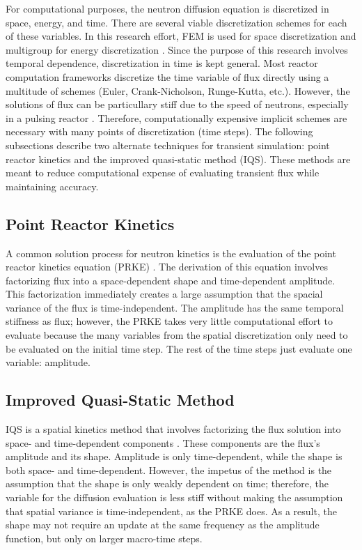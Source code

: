 For computational purposes, the neutron diffusion equation is discretized in space, energy, and time.  There are several viable discretization schemes for each of these variables. In this research effort, FEM is used for space discretization and multigroup for energy discretization \cite{zeinkiewicz2005finite, duderstadt1976nuclear}. Since the purpose of this research involves temporal dependence, discretization in time is kept general. Most reactor computation frameworks discretize the time variable of flux directly using a multitude of schemes (Euler, Crank-Nicholson, Runge-Kutta, etc.).  However, the solutions of flux can be particullary stiff due to the speed of neutrons, especially in a pulsing reactor \cite{TWIGL_benchmark}. Therefore, computationally expensive implicit schemes are necessary with many points of discretization (time steps). The following subsections describe two alternate techniques for transient simulation: point reactor kinetics and the improved quasi-static method (IQS). These methods are meant to reduce computational expense of evaluating transient flux while maintaining accuracy.

\subsection{Point Reactor Kinetics}

A common solution process for neutron kinetics is the evaluation of the point reactor kinetics equation (PRKE) \cite{Planchard_1991}.  The derivation of this equation involves factorizing flux into a space-dependent shape and time-dependent amplitude.  This factorization immediately creates a large assumption that the spacial variance of the flux is time-independent.  The amplitude has the same temporal stiffness as flux; however, the PRKE takes very little computational effort to evaluate because the many variables from the spatial discretization only need to be evaluated on the initial time step.  The rest of the time steps just evaluate one variable: amplitude.


\subsection{Improved Quasi-Static Method}

IQS is a spatial kinetics method that involves factorizing the flux solution into space- and time-dependent components \cite{Ott_1966,Dulla2008,Devooght_1984,Monier_diss,Sissaoui_1995}.  These components are the flux's amplitude and its shape. Amplitude is only time-dependent, while the shape is both space- and time-dependent.  However, the impetus of the method is the assumption that the shape is only weakly dependent on time; therefore, the variable for the diffusion evaluation is less stiff without making the assumption that spatial variance is time-independent, as the PRKE does.  As a result, the shape may not require an update at the same frequency as the amplitude function, but only on larger macro-time steps.  

